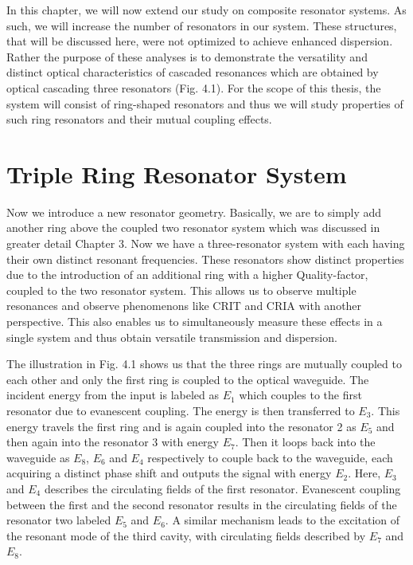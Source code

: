 In this chapter, we will now extend our study on composite resonator systems. As such, we will increase the number of resonators in our system. These structures, that will be discussed here, were not optimized to achieve enhanced dispersion. Rather the purpose of these analyses is to demonstrate the versatility and distinct optical characteristics of cascaded resonances which are obtained by optical cascading three resonators (Fig. 4.1). For the scope of this thesis, the system will consist of ring-shaped resonators and thus we will study properties of such ring resonators and their mutual coupling effects.
\section{Triple Ring Resonator System}
Now we introduce a new resonator geometry. Basically, we are to simply add another ring above the coupled two resonator system which was discussed in greater detail Chapter 3. Now we have a three-resonator system with each having their own distinct resonant frequencies. These resonators show distinct properties due to the introduction of an additional ring with a higher Quality-factor, coupled to the two resonator system. This allows us to observe multiple resonances and observe phenomenons like CRIT and CRIA with another perspective. This also enables us to simultaneously measure these effects in a single system and thus obtain versatile transmission and dispersion.

The illustration in Fig. 4.1 shows us that the three rings are mutually coupled to each other and only the first ring is coupled to the optical waveguide. The incident energy from the input is labeled as $E_{1}$ which couples to the first resonator due to evanescent coupling. The energy is then transferred to $E_{3}$. This energy travels the first ring and is again coupled into the resonator 2 as $E_{5}$ and then again into the resonator 3 with energy $E_{7}$. Then it loops back into the waveguide as $E_{8}$, $E_{6}$ and $E_{4}$ respectively to couple back to the waveguide, each acquiring a distinct phase shift and outputs the signal with energy $E_{2}$. Here, $E_{3}$ and $E_{4}$ describes the circulating fields of the first resonator. Evanescent coupling between the first and the second resonator results in the circulating fields of the resonator two labeled $E_{5}$ and $E_{6}$. A similar mechanism leads to the excitation of the resonant mode of the third cavity, with circulating fields described by $E_{7}$ and $E_{8}$.

